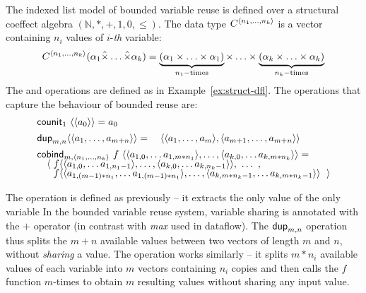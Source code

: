 \begin{example}
\label{thm:struct-bll}
The indexed list model of bounded variable reuse is defined over a structural coeffect
algebra $(\mathbb{N}, \ast, +, 1, 0, \leq)$. The data type $\ctyp{\langle n_1, \ldots, n_k\rangle}$
is a vector containing $n_i$ values of $i$-\textit{th} variable:
%
\begin{equation*}
C^{\langle n_1, \ldots, n_k\rangle}(\alpha_1 \hat{\times} \ldots \hat{\times} \alpha_k) =
\underbrace{(\alpha_1 \times \ldots \times \alpha_1)}_{n_1-\textnormal{times}} \times \ldots \times
  \underbrace{(\alpha_k \times \ldots \times \alpha_k)}_{n_k-\textnormal{times}}
\end{equation*}
%
The  and  operations are defined as in Example~\ref{ex:struct-dfl}.
The operations that capture the behaviour of bounded reuse are:
%
\begin{equation*}
\begin{array}{l}
\textnormal{\sffamily counit}_{1}~\langle \langle a_0 \rangle \rangle = a_0
\\[0.45em]
\textnormal{\sffamily dup}_{m, n} \langle \langle a_1, \ldots, a_{m+n} \rangle \rangle =
\quad \langle \langle a_1, \ldots, a_m \rangle, \langle a_{m+1}, \ldots, a_{m+n} \rangle \rangle
\\[0.45em]
\textnormal{\sffamily cobind}_{m, \langle n_1, \ldots, n_k \rangle}~f~
  \langle \langle a_{1,0}, \ldots a_{1,m\ast{n_1}} \rangle, \ldots, \langle a_{k,0}, \ldots a_{k,m\ast{n_k}} \rangle \rangle = \\[-0.25em]
\quad \langle\; f \langle \langle a_{1,0}, \ldots a_{1,{n_1 - 1}} \rangle, \ldots, \langle a_{k,0}, \ldots a_{k,{n_k - 1}} \rangle \rangle, ~\ldots~, \\[-0.25em]
\quad ~~ f \langle \langle a_{1,(m-1)\ast n_1}, \ldots a_{1,(m-1) \ast n_1} \rangle, \ldots,
                   \langle a_{k,m\ast n_k - 1}, \ldots a_{k,m\ast n_k - 1} \rangle \rangle~\; \rangle
\end{array}
\end{equation*}
\end{example}

\noindent
The  operation is defined as previously -- it extracts the only value of the only
variable In the bounded variable reuse system, variable sharing is annotated with the $+$ operator
(in contrast with \textit{max} used in dataflow). The $\textnormal{\sffamily dup}_{m,n}$ operation thus splits the $m+n$
available values between two vectors of length $m$ and $n$, without \emph{sharing} a value. The
 operation works similarly -- it splits $m\ast n_i$ available values of each
variable into $m$ vectors containing $n_i$ copies and then calls the $f$ function $m$-times to
obtain $m$ resulting values without sharing any input value.

